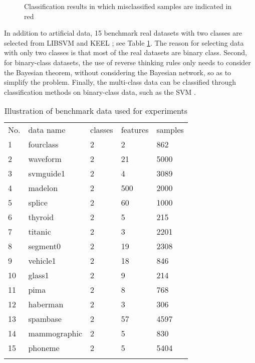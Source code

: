 \begin{figure}[htbp]
  \centering
  \hspace{0 in}
  \caption{Classification results in which misclassified samples are indicated in red}
  \label{Figure2}
\end{figure}

In addition to artificial data, 15 benchmark real datasets with two classes are selected from LIBSVM \cite{Chang2011} and KEEL \cite{Alcal-Fdez2011}; see Table \ref{Table3}. The reason for selecting data with only two classes is that most of the real datasets are binary class. Second, for binary-class datasets, the use of reverse thinking rules only needs to consider the Bayesian theorem, without considering the Bayesian network, so as to simplify the problem. Finally, the multi-class data can be classified through classification methods on binary-class data, such as the SVM \cite{Ji2017}.

\begin{table}[htbp]
\centering
\caption{Illustration of benchmark data used for experiments}
\label{Table3}
\begin{tabular}{lllll}

\hline\noalign{\smallskip}
No.	&data name	&classes	&features	&samples\\

\noalign{\smallskip}\hline\noalign{\smallskip}
1& fourclass  &2	&2	&862\\
2&	waveform  &2	&21	&5000\\
3&	svmguide1 &2	&4	&3089\\
4&	madelon	  &2	&500	&2000\\
5&	splice	  &2	&60	&1000\\
6&	thyroid   &2	&5	&215\\
7&	titanic	  &2	&3	&2201\\
8&	segment0 &2	&19	&2308\\
9&	vehicle1  &2	&18	&846\\
10&	glass1    &2	&9	&214\\
11&	pima     &2	&8	&768\\
12&	haberman  &2 &3 &306\\
13&	spambase  &2	&57	&4597\\
14&	mammographic   &2	&5	&830 \\
15&	phoneme   &2	&5	&5404\\
\noalign{\smallskip}\hline
\end{tabular}
\end{table}


